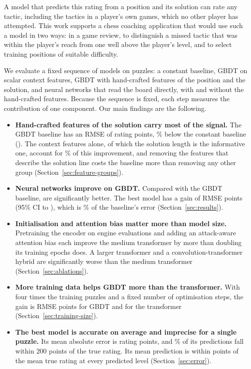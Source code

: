 \documentclass[11pt]{article}
\begin{document}
A model that predicts this rating from a position and its solution can rate
any tactic, including the tactics in a player's own games, which no other
player has attempted. This work supports a chess coaching application that
would use such a model in two ways: in a game review, to distinguish a missed
tactic that was within the player's reach from one well above the player's
level, and to select training positions of suitable difficulty.

We evaluate a fixed sequence of models on  puzzles: a constant
baseline, GBDT on scalar context features, GBDT with hand-crafted features of
the position and the solution, and neural networks that read the board
directly, with and without the hand-crafted features. Because the sequence is
fixed, each step measures the contribution of one component. Our main
findings are the following.
\begin{itemize}
\item \textbf{Hand-crafted features of the solution carry most of the
signal.} The GBDT baseline has an RMSE of  rating points,
\% below the constant baseline ().
The context features alone, of which the solution length is the informative
one, account for \% of this
improvement\iffeatures, and removing the features that describe the solution
line costs the baseline more than removing any other group
(Section~\ref{sec:feature-groups})\fi.
\item \textbf{Neural networks improve on GBDT.} Compared with the GBDT
baseline,  are significantly better. The best model has
a gain of  RMSE points (95\% CI  to
), which is \% of the baseline's error
(Section~\ref{sec:results}).
\ifchangestart\ifchangeattacks
\item \textbf{Initialisation and attention bias matter more than model
size.} Pretraining the encoder on engine evaluations and adding an
attack-aware attention bias each improve the medium transformer by more than
doubling its training epochs does. A larger transformer and a
convolution-transformer hybrid are significantly worse than the medium
transformer (Section~\ref{sec:ablations}).
\fi\fi
\ifmore
\item \textbf{More training data helps GBDT more than the transformer.} With
four times the training puzzles and a fixed number of optimisation steps, the
gain is  RMSE points for GBDT and
 for
the transformer (Section~\ref{sec:training-size}).
\fi
\item \textbf{The best model is accurate on average and imprecise for a
single puzzle.} Its mean absolute error is  rating
points\iflook, and \% of its predictions fall within
200 points of the true rating. Its mean prediction is within
 points of the mean true rating at every
predicted level (Section~\ref{sec:error})\fi.
\end{itemize}
\end{document}
